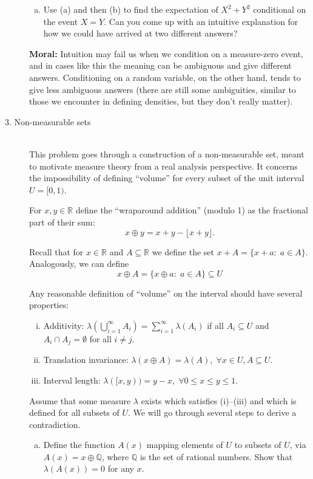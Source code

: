 \documentclass{article}
\newcommand{\QQ}{\mathbb{Q}}
\newcommand{\RR}{\mathbb{R}}
\begin{document}
\begin{description}
\begin{enumerate}[(a)]
\item Use (a) and then (b) to find the expectation of $X^2 + Y^2$ conditional on the event $X = Y$. Can you come up with an intuitive explanation for how we could have arrived at two different answers?


\end{enumerate}

{\bf Moral:} Intuition may fail us when we condition on a measure-zero event, and in cases like this the meaning can be ambiguous and give different answers. Conditioning on a random variable, on the other hand, tends to give less ambiguous answers (there are still some ambiguities, similar to those we encounter in defining densities, but they don't really matter).



\item[3. Non-measurable sets]\hfill\\

This problem goes through a construction of a non-measurable set, meant to motivate measure theory from a real analysis perspective. It concerns the impossibility of defining ``volume'' for every subset of the unit interval $U=[0,1)$.

For $x,y \in \RR$ define the ``wraparound addition'' (modulo 1) as the fractional part of their sum:
\[
x \oplus y = x + y - \lfloor x + y \rfloor.
\]

Recall that for $x \in \RR$ and $A \subseteq \RR$ we define the set $x + A = \{x + a:\; a \in A\}$. Analogously, we can define 
\[
x \oplus A = \{x \oplus a:\; a \in A\} \subseteq U
\]

Any reasonable definition of ``volume'' on the interval should have several properties:
\begin{enumerate}[(i)]
\item Additivity: $\lambda(\bigcup_{i=1}^\infty A_i) = \sum_{i=1}^\infty \lambda(A_i)$ if all $A_i\subseteq U$ and $A_i \cap A_j = \emptyset$ for all $i \neq j$.
\item Translation invariance: $\lambda(x \oplus A) = \lambda(A), \;\forall x\in U, A\subseteq U$.
\item Interval length: $\lambda([x,y)) = y - x, \;\forall 0 \leq x \leq y \leq 1$.
\end{enumerate}
Assume that some measure $\lambda$ exists which satisfies (i)--(iii) and which is defined for all subsets of $U$. We will go through several steps to derive a contradiction.

\begin{enumerate}[(a)]
\item Define the function $A(x)$ mapping elements of $U$ to subsets of $U$, via $A(x) = x \oplus \QQ$, where $\QQ$ is the set of rational numbers. Show that $\lambda(A(x)) = 0$ for any $x$.



\end{enumerate}
\end{description}
\end{document}
